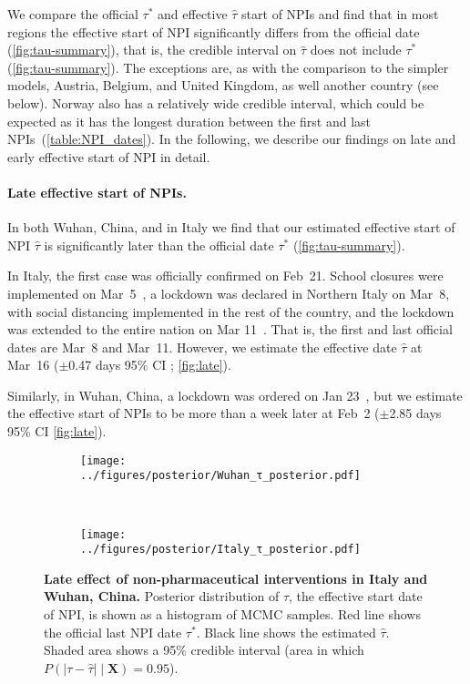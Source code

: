 \documentclass[12pt]{extarticle}
\let\vec\mathbf
\begin{document}
We compare the official $\tau^*$ and effective $\hat{\tau}$ start of NPIs and find that in most regions the effective start of NPI  significantly differs from the official date (\autoref{fig:tau-summary}), that is, the credible interval on $\hat{\tau}$ does not include $\tau^*$ (\autoref{fig:tau-summary}). The exceptions are, as with the comparison to the simpler models, Austria, Belgium, and United Kingdom, as well another country (see below). Norway also has a relatively wide credible interval, which could be expected as it has the longest duration between the first and last NPIs~(\autoref{table:NPI_dates}).
In the following, we describe our findings on late and early effective start of NPI in detail.



\paragraph*{Late effective start of NPIs.}
In both Wuhan, China, and in Italy we find that our estimated effective start of NPI $\hat{\tau}$ is significantly later than the official date $\tau^*$ (\autoref{fig:tau-summary}). 

In Italy, the first case was officially confirmed on Feb~21. School closures were implemented on Mar~5~\citep{Flaxman2020}, a lockdown was declared in Northern Italy on Mar~8, with social distancing implemented in the rest of the country, and the lockdown was extended to the entire nation on Mar 11~\citep{Gatto2020}.
That is, the first and last official dates are Mar~8 and Mar~11.
However, we estimate the effective date $\hat{\tau}$ at Mar~16 ($\pm$0.47 days 95\% CI ; \autoref{fig:late}). 

Similarly, in Wuhan, China, a lockdown was ordered on Jan 23~\citep{Li2020}, but we estimate the effective start of NPIs to be more than a week later at Feb~2 ($\pm$2.85 days 95\% CI \autoref{fig:late}).



\begin{figure}[h]
    \centering
    \begin{subfigure}{0.45\textwidth}
        \texttt{[image: ../figures/posterior/Wuhan\_τ\_posterior.pdf]}
    \end{subfigure}
  	~
    \begin{subfigure}{0.45\textwidth}
        \texttt{[image: ../figures/posterior/Italy\_τ\_posterior.pdf]}
    \end{subfigure}
    \caption{
	\textbf{Late effect of non-pharmaceutical interventions in Italy and Wuhan, China.}
    Posterior distribution of $\tau$, the effective start date of NPI, is shown as a histogram of MCMC samples. Red line shows the official last NPI date $\tau^*$. Black line shows the estimated $\hat{\tau}$. Shaded area shows a 95\% credible interval (area in which $P(|\tau - \hat{\tau}| \mid \vec{X}) = 0.95$). 
    }
    \label{fig:late}
\end{figure}
\end{document}
